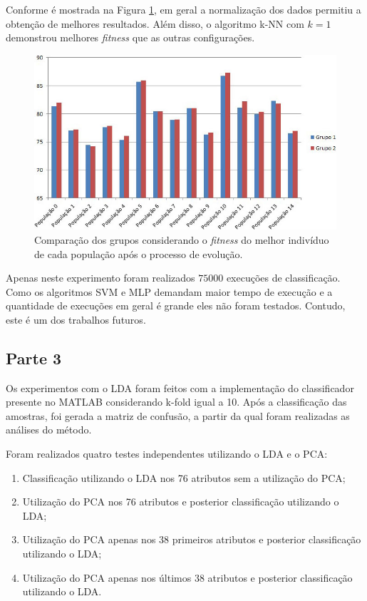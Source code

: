\documentclass[conference]{IEEEtran}
\begin{document}
Conforme é mostrada na Figura \ref{figura:grupo_01_vs_grupo_02}, em geral a normalização dos dados permitiu a obtenção de melhores resultados. Além disso, o algoritmo k-NN com $k = 1$ demonstrou melhores \textit{fitness} que as outras configurações.

\begin{figure}
  \centering
  \includegraphics[scale=0.38]{grupo_01_vs_grupo_02.jpg}
  \caption{Comparação dos grupos considerando o \textit{fitness} do melhor indivíduo de cada população após o processo de evolução.}
  \label{figura:grupo_01_vs_grupo_02}
\end{figure}

Apenas neste experimento foram realizados $75000$ execuções de classificação. Como os algoritmos SVM e MLP demandam maior tempo de execução e a quantidade de execuções em geral é grande eles não foram testados. Contudo, este é um dos trabalhos futuros.

\subsection{Parte 3}

Os experimentos com o LDA foram feitos com a implementação do classificador presente no MATLAB considerando k-fold igual a 10. Após a classificação das amostras, foi gerada a matriz de confusão, a partir da qual foram realizadas as análises do método.

Foram realizados quatro testes independentes utilizando o LDA e o PCA:
\begin{enumerate}
  \item Classificação utilizando o LDA nos 76 atributos sem a utilização do PCA;
  \item Utilização do PCA nos 76 atributos e posterior classificação utilizando o LDA;
  \item Utilização do PCA apenas nos 38 primeiros atributos e posterior classificação utilizando o LDA;
  \item Utilização do PCA apenas nos últimos 38 atributos e posterior classificação utilizando o LDA.
\end{enumerate}
 
\end{document}
